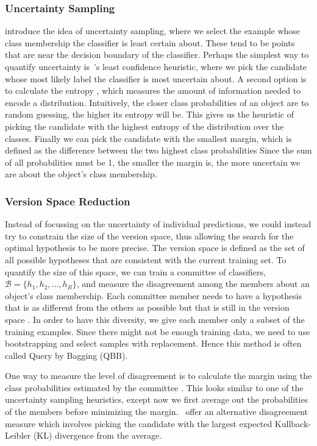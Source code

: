 \documentclass[fleqn,10pt,lineno]{wlpeerj} %
\newcommand{\B}{\mathcal{B}}
\begin{document}
\subsubsection*{Uncertainty Sampling}

\cite{lewis94} introduce the idea of uncertainty sampling, where we select the
example whose class membership the classifier is least certain about. These
tend to be points that are near the decision boundary of the classifier.
Perhaps the simplest way to quantify uncertainty is~\cite{culotta05}'s least
confidence heuristic, where we pick the candidate whose most likely label the
classifier is most uncertain about. A second option is to calculate the entropy
\citep{shannon48}, which measures the amount of information needed to encode a
distribution. Intuitively, the closer class probabilities of an object are to
random guessing, the higher its entropy will be. This gives us the heuristic of
picking the candidate with the highest entropy of the distribution over the
classes. Finally we can pick the candidate with the smallest margin, which is
defined as the difference between the two highest class probabilities
\citep{scheffer01} Since the sum of all probabilities must be 1, the smaller
the margin is, the more uncertain we are about the object's class membership.

\subsubsection*{Version Space Reduction}

Instead of focussing on the uncertainty of individual predictions, we could
instead try to constrain the size of the version space, thus allowing the
search for the optimal hypothesis to be more precise. The version space is
defined as the set of all possible hypotheses that are consistent with the
current training set. To quantify the size of this space, we can train a
committee of classifiers, $\B = \{h_1, h_2, ..., h_B\}$, and measure the
disagreement among the members about an object's class membership. Each
committee member needs to have a hypothesis that is as different from the
others as possible but that is still in the version space \citep{melville04}.
In order to have this diversity, we give each member only a subset of the
training examples. Since there might not be enough training data, we need to
use bootstrapping and select samples with replacement. Hence this method is
often called Query by Bagging (QBB).

One way to measure the level of disagreement is to calculate the margin using
the class probabilities estimated by the committee \citep{melville04}. This
looks similar to one of the uncertainty sampling heuristics, except now we
first average out the probabilities of the members before minimizing the
margin.~\cite{mccallum98} offer an alternative disagreement measure which
involves picking the candidate with the largest expected Kullback-Leibler (KL)
divergence from the average.
\end{document}
